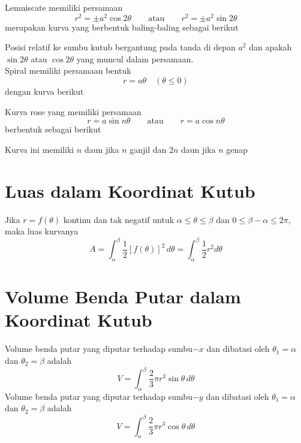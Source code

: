 \documentclass{article}
\begin{document}
Lemniscate memiliki persamaan 
$$ r^2=\pm a^2\cos 2\theta \qquad \text{atau}\qquad r^2=\pm a^2\sin 2\theta $$
merupakan kurva yang berbentuk baling-baling sebagai berikut 
\begin{center}
	\end{center}
Posisi relatif ke sumbu kutub bergantung pada tanda di depan $a^2$ dan apakah $\sin 2\theta$ atau $\cos 2\theta$ yang muncul dalam persamaan.\\
Spiral memiliki persamaan bentuk 
$$ r=a\theta \quad (\theta\leq 0) $$
dengan kurva berikut
\begin{center}
	\end{center} 
Kurva rose yang memiliki persamaan 
$$ r=a\sin n\theta \qquad\text{atau}\qquad r=a\cos n\theta $$
berbentuk sebagai berikut 
\begin{center}
	\end{center}
Kurva ini memiliki $n$ daun jika $n$ ganjil dan $2n$ daun jika $n$ genap
\section{Luas dalam Koordinat Kutub}
Jika $r=f(\theta)$ kontinu dan tak negatif untuk $\alpha \leq \theta\leq \beta$ dan $0\leq \beta-\alpha\leq 2\pi$, maka luas kurvanya 
$$ A=\int_\alpha^\beta \dfrac{1}{2}[f(\theta)]^2\, d\theta = \int_\alpha^\beta \dfrac{1}{2} r^2 d\theta $$
\section{Volume Benda Putar dalam Koordinat Kutub}
Volume benda putar yang diputar terhadap sumbu$-x$ dan dibatasi oleh $\theta_1=\alpha$ dan $\theta_2=\beta$ adalah 
$$ V=\int_\alpha^\beta \dfrac{2}{3}\pi r^3\sin\theta \, d\theta $$
Volume benda putar yang diputar terhadap sumbu$-y$ dan dibatasi oleh $\theta_1=\alpha$ dan $\theta_2=\beta$ adalah 
$$ V=\int_\alpha^\beta \dfrac{2}{3}\pi r^3\cos\theta \, d\theta $$
\end{document}
